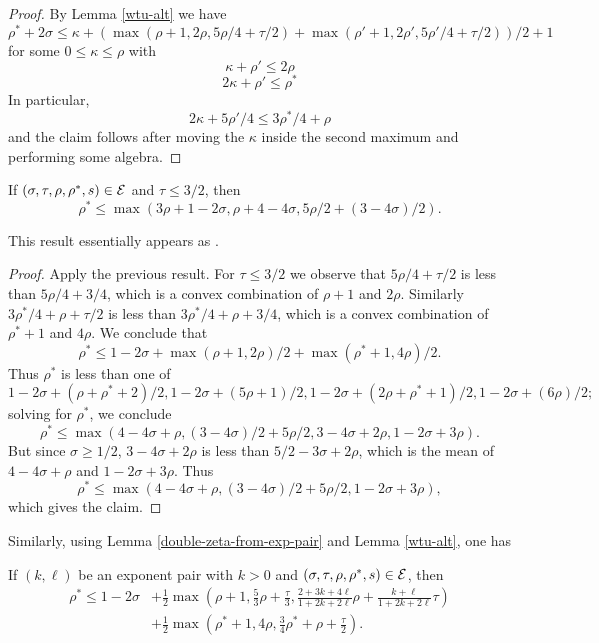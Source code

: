 \literature
{}

\begin{proof} By Lemma \ref{wtu-alt} we have
$$ \rho^* + 2\sigma \leq \kappa + ( \max( \rho+1, 2\rho, 5\rho/4+\tau/2)+ \max( \rho'+1, 2\rho', 5\rho'/4+\tau/2) )/2 + 1$$
for some $0 \leq \kappa \leq \rho$ with
$$ \kappa + \rho' \leq 2\rho$$
$$ 2\kappa + \rho' \leq \rho^*$$
In particular,
$$ 2\kappa + 5\rho'/4 \leq 3\rho^*/4 + \rho$$
and the claim follows after moving the $\kappa$ inside the second maximum and performing some algebra.
\end{proof}

\begin{corollary}\label{hb-energy-simp}  If $(\sigma,\tau,\rho,\rho^*,s) \in \mathcal{E}$ and $\tau \leq 3/2$, then
$$ \rho^* \leq \max(3 \rho + 1-2\sigma, \rho +4-4\sigma, 5\rho/2 + (3-4\sigma)/2).$$
\end{corollary}

\literature
{}

This result essentially appears as \cite[Lemma 3]{heathbrown_zero_1979}.

\begin{proof} Apply the previous result.  For $\tau \leq 3/2$ we observe that $5\rho/4+\tau/2$ is less than $5\rho/4 + 3/4$, which is a convex combination of $\rho+1$ and $2\rho$.  Similarly $3\rho^*/4+\rho+\tau/2$ is less than $3\rho^*/4+\rho+3/4$, which is a convex combination of $\rho^*+1$ and $4\rho$. We conclude that
$$ \rho^* \leq  1-2\sigma + \max(\rho+1, 2\rho)/2 + \max(\rho^*+1, 4\rho)/2.$$
Thus $\rho^*$ is less than one of
$$ 1-2\sigma + (\rho+\rho^*+2)/2, 1-2\sigma + (5\rho+1)/2, 1-2\sigma + (2\rho+\rho^*+1)/2, 1-2\sigma + (6\rho)/2;$$
solving for $\rho^*$, we conclude
$$ \rho^* \leq \max( 4-4\sigma + \rho, (3-4\sigma)/2 + 5\rho/2, 3-4\sigma + 2\rho, 1-2\sigma + 3\rho).$$
But since $\sigma \geq 1/2$, $3-4\sigma + 2\rho$ is less than $5/2-3\sigma + 2\rho$, which is the mean of $4-4\sigma+\rho$ and $1-2\sigma+3\rho$. Thus
$$ \rho^* \leq \max( 4-4\sigma + \rho, (3-4\sigma)/2 + 5\rho/2, 1-2\sigma + 3\rho),$$
which gives the claim.
\end{proof}

Similarly, using Lemma \ref{double-zeta-from-exp-pair} and Lemma \ref{wtu-alt}, one has

\begin{theorem}
If $(k, \ell)$ be an exponent pair with $k > 0$ and $(\sigma, \tau, \rho, \rho^*, s)\in \mathcal{E}$, then
\begin{align*}
\rho^* \le 1 - 2\sigma &+ \frac{1}{2}\max\left(\rho+1, \frac{5}{3}\rho + \frac{\tau}{3}, \frac{2+3k+4\ell}{1+2k+2\ell} \rho + \frac{k+\ell}{1+2k+2\ell} \tau\right)\\
&+ \frac{1}{2}\max\left(\rho^*+1, 4\rho, \frac{3}{4}\rho^*+\rho+\frac{\tau}{2}\right).
\end{align*}
\end{theorem}

